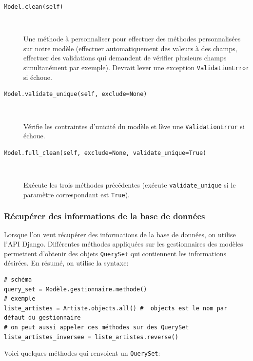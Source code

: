 \documentclass[a4paper, 10pt]{article}
\begin{document}
{\begin{description}
	\item[\texttt{Model.clean(self)}]~

	      Une méthode à personnaliser pour effectuer des méthodes personnalisées sur notre modèle (effectuer automatiquement des valeurs à des champs, effectuer des validations qui demandent de vérifier plusieurs champs simultanément par exemple). Devrait lever une exception \texttt{ValidationError} si échoue.

	\item[\texttt{Model.validate_unique(self, exclude=None)}]~

	      Vérifie les contraintes d'unicité du modèle et lève une \texttt{ValidationError} si échoue.

	\item[\texttt{Model.full_clean(self, exclude=None, validate_unique=True)}]~

	      Exécute les trois méthodes précédentes (exécute \texttt{validate\_unique} si le paramètre correspondant est \texttt{True}).
\end{description}

\subsubsection{Récupérer des informations de la base de données}
Lorsque  l'on veut récupérer des informations de la base de données, on utilise l'API Django. Différentes méthodes appliquées sur les gestionnaires des modèles permettent d'obtenir des objets \texttt{QuerySet} qui contiennent les informations désirées. En résumé, on utilise la syntaxe:
\begin{verbatim}
# schéma
query_set = Modèle.gestionnaire.methode()
# exemple
liste_artistes = Artiste.objects.all() #  objects est le nom par défaut du gestionnaire
# on peut aussi appeler ces méthodes sur des QuerySet
liste_artistes_inversee = liste_artistes.reverse()
\end{verbatim}
Voici quelques méthodes qui renvoient un \texttt{QuerySet}:

}
\end{document}
